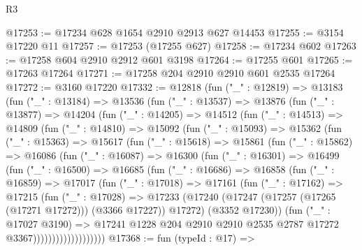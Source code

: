 \begin{lexlean}{R3}
\begin{coremodule}
@17253 := @17234 @628 @1654 @2910 @2913 @627 @14453
@17255 := @3154 @17220 @11
@17257 := @17253 (@17255 @627)
@17258 := @17234 @602
@17263 := @17258 @604 @2910 @2912 @601 @3198
@17264 := @17255 @601
@17265 := @17263 @17264
@17271 := @17258 @204 @2910 @2910 @601 @2535 @17264
@17272 := @3160 @17220
@17332 := @12818
    (fun ("_" : @12819) =>
    @13183
      (fun ("_" : @13184) =>
      @13536
        (fun ("_" : @13537) =>
        @13876
          (fun ("_" : @13877) =>
          @14204
            (fun ("_" : @14205) =>
            @14512
              (fun ("_" : @14513) =>
              @14809
                (fun ("_" : @14810) =>
                @15092
                  (fun ("_" : @15093) =>
                  @15362
                    (fun ("_" : @15363) =>
                    @15617
                      (fun ("_" : @15618) =>
                      @15861
                        (fun ("_" : @15862) =>
                        @16086
                          (fun ("_" : @16087) =>
                          @16300
                            (fun ("_" : @16301) =>
                            @16499
                              (fun ("_" : @16500) =>
                              @16685
                                (fun ("_" : @16686) =>
                                @16858
                                  (fun ("_" : @16859) =>
                                  @17017
                                    (fun ("_" : @17018) =>
                                    @17161
                                      (fun ("_" : @17162) =>
                                      @17215
                                        (fun ("_" : @17028) =>
                                        @17233
                                          (@17240
                                            (@17247
                                              (@17257 (@17265 (@17271 @17272)))
                                              (@3366 @17227))
                                            @17272)
                                          (@3352 @17230))
                                        (fun ("_" : @17027 @3190) =>
                                        @17241
                                          @1228
                                          @204
                                          @2910
                                          @2910
                                          @2535
                                          @2787
                                          @17272
                                          @3367)))))))))))))))))))
@17368 := fun (typeId : @17) =>

\end{coremodule}
\end{lexlean}

